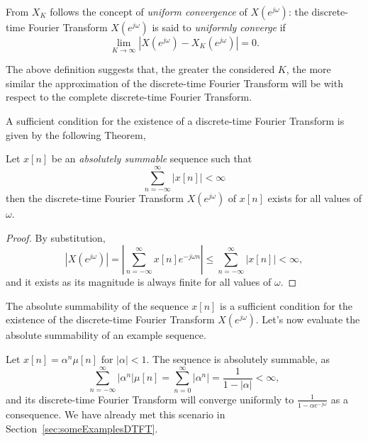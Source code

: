 \documentclass[\documentfontsize, twocolumn]{\classname}
\begin{document}
From $X_K$ follows the concept of \emph{uniform convergence} of $X(e^{j\omega})$: the discrete-time Fourier Transform $X(e^{j\omega})$ is said to \emph{uniformly converge} if
\begin{equation}\label{eqn:uniformConvergence}
    \lim_{K\rightarrow \infty}\left|X(e^{j\omega}) - X_K(e^{j\omega})\right| = 0.
\end{equation}

The above definition suggests that, the greater the considered $K$, the more similar the approximation of the discrete-time Fourier Transform will be with respect to the complete discrete-time Fourier Transform.

A sufficient condition for the existence of a discrete-time Fourier Transform is given by the following Theorem,
\begin{thm}\label{thm:existenceDTFT}
    Let $x[n]$ be an \emph{absolutely summable} sequence such that
    \[
        \sum_{n=-\infty}^{\infty}|x[n]| < \infty
    \]
    then the discrete-time Fourier Transform $X(e^{j\omega})$ of $x[n]$ exists for all values of $\omega$.
\end{thm}

\begin{proof}
    By substitution,
    \[
        \left|X(e^{j\omega})\right| = \left|\sum_{n=-\infty}^\infty x[n] e^{-j\omega n}\right| \leq \sum_{n=-\infty}^\infty|x[n]| < \infty,
    \]
    and it exists as its magnitude is always finite for all values of $\omega$.
\end{proof}

The absolute summability of the sequence $x[n]$ is a sufficient condition for the existence of the discrete-time Fourier Transform $X(e^{j\omega})$. Let's now evaluate the absolute summability of an example sequence.

Let $x[n] = \alpha^n \mu[n]$ for $|\alpha| < 1$. The sequence is absolutely summable, as
\[
    \sum_{n=-\infty}^\infty |\alpha^n| \mu[n] = \sum_{n=0}^\infty |\alpha^n| = \frac {1}{1-|\alpha|} < \infty,
\]
and its discrete-time Fourier Transform will converge uniformly to $\frac{1}{1-\alpha e^{-j\omega}}$ as a consequence. We have already met this scenario in Section~\ref{sec:someExamplesDTFT}.
\end{document}

